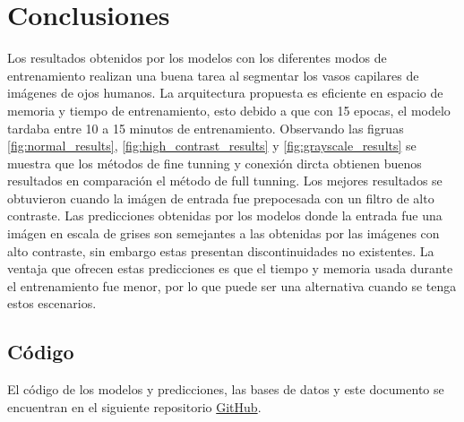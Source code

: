 \section{Conclusiones}

Los resultados obtenidos por los modelos con los diferentes modos de entrenamiento realizan una buena tarea al segmentar los vasos capilares de imágenes de ojos humanos. La arquitectura propuesta es eficiente en espacio de memoria y tiempo de entrenamiento, esto debido a que con 15 epocas, el modelo tardaba entre 10 a 15 minutos de entrenamiento. Observando las figruas \ref{fig:normal_results}, \ref{fig:high_contrast_results} y \ref{fig:grayscale_results} se muestra que los métodos de fine tunning y conexión dircta obtienen buenos resultados en comparación el método de full tunning. Los mejores resultados se obtuvieron cuando la imágen de entrada fue prepocesada con un filtro de alto contraste. Las predicciones obtenidas por los modelos donde la entrada fue una imágen en escala de grises son semejantes a las obtenidas por las imágenes con alto contraste, sin embargo estas presentan discontinuidades no existentes. La ventaja que ofrecen estas predicciones es que el tiempo y memoria usada durante el entrenamiento fue menor, por lo que puede ser una alternativa cuando se tenga estos escenarios.

\subsection{Código}

El código de los modelos y predicciones, las bases de datos y este documento se encuentran en el siguiente repositorio \href{https://github.com/giovannilopez9808/reconocimiento_de_patrones_proyecto_02/}{GitHub}.